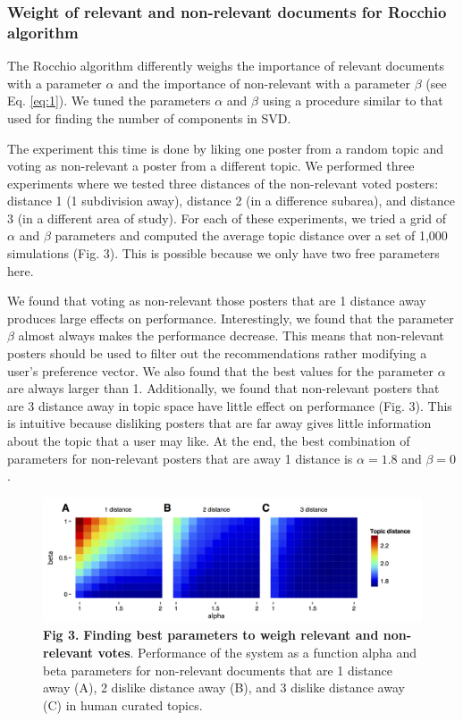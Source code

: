 \documentclass[a4paper]{article}
\begin{document}
\subsubsection*{Weight of relevant and non-relevant documents for Rocchio algorithm}

The Rocchio algorithm differently weighs the importance of relevant documents with a parameter $\alpha$ and the importance of non-relevant with a parameter $\beta$ (see  Eq. \ref{eq:1}). We tuned the parameters $\alpha$ and $\beta$ using a procedure similar to that used for finding the number of components in SVD.

The experiment this time is done by liking one poster from a random topic and voting as non-relevant a poster from a different topic. We performed three experiments where we tested three distances of the non-relevant voted posters: distance 1 (1 subdivision away), distance 2 (in a difference subarea), and distance 3 (in a different area of study). For each of these experiments, we tried a grid of $\alpha$ and $\beta$ parameters and computed the average topic distance over a set of 1,000 simulations (Fig. 3). This is possible because we only have two free parameters here.

We found that voting as non-relevant those posters that are 1 distance away produces large effects on performance. Interestingly, we found that the parameter $\beta$ almost always makes the performance decrease. This means that non-relevant posters should be used to filter out the recommendations rather modifying a user’s preference vector. We also found that the best values for the parameter $\alpha$ are always larger than 1. Additionally, we found that non-relevant posters that are 3 distance away in topic space have little effect on performance (Fig. 3). This is intuitive because disliking posters that are far away gives little information about the topic that a user may like. At the end, the best combination of parameters for non-relevant posters that are away 1 distance is $\alpha=1.8$ and $\beta=0$.


\begin{figure}[!ht]
\centering
\includegraphics[width=5in]{alpha_beta_relation}
\caption*{\textbf{Fig 3.} \textbf{Finding best parameters to weigh relevant and non-relevant votes}. Performance of the system as a function alpha and beta parameters for non-relevant documents that are 1 distance away (A), 2 dislike distance away (B), and 3 dislike distance away (C) in human curated topics.}
\end{figure}
\end{document}
